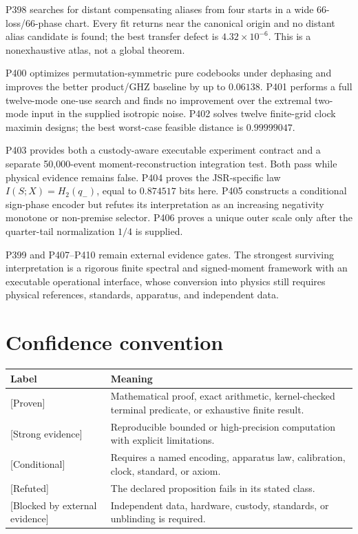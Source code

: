 \documentclass[11pt,a4paper,openany]{report}
\newcommand{\statusProven}{\textcolor{fingreen}{[Proven]}}
\newcommand{\statusStrong}{\textcolor{finblue}{[Strong evidence]}}
\newcommand{\statusConditional}{\textcolor{finviolet}{[Conditional]}}
\newcommand{\statusRefuted}{\textcolor{finred}{[Refuted]}}
\newcommand{\statusBlocked}{\textcolor{finorange}{[Blocked by external evidence]}}
\begin{document}
P398 searches for distant compensating aliases from four starts in a wide
66-loss/66-phase chart. Every fit returns near the canonical origin and no
distant alias candidate is found; the best transfer defect is
$4.32\times10^{-6}$. This is a nonexhaustive atlas, not a global theorem.

P400 optimizes permutation-symmetric pure codebooks under dephasing and
improves the better product/GHZ baseline by up to $0.06138$. P401 performs a
full twelve-mode one-use search and finds no improvement over the extremal
two-mode input in the supplied isotropic noise. P402 solves twelve finite-grid
clock maximin designs; the best worst-case feasible distance is $0.99999047$.

P403 provides both a custody-aware executable experiment contract and a
separate 50,000-event moment-reconstruction integration test. Both pass while
physical evidence remains false. P404 proves the JSR-specific law
$I(S;X)=H_2(q_-)$, equal to $0.874517$ bits here. P405 constructs a
conditional sign-phase encoder but refutes its interpretation as an
increasing negativity monotone or non-premise selector. P406 proves a unique
outer scale only after the quarter-tail normalization $1/4$ is supplied.

P399 and P407--P410 remain external evidence gates. The strongest surviving
interpretation is a rigorous finite spectral and signed-moment framework with
an executable operational interface, whose conversion into physics still
requires physical references, standards, apparatus, and independent data.

\chapter*{Confidence convention}
\begin{center}
\small
\begin{longtable}{@{}p{}p{}@{}}
\toprule
\textbf{Label} & \textbf{Meaning}\\
\midrule
\endhead
\statusProven & Mathematical proof, exact arithmetic, kernel-checked terminal predicate, or exhaustive finite result.\\
\statusStrong & Reproducible bounded or high-precision computation with explicit limitations.\\
\statusConditional & Requires a named encoding, apparatus law, calibration, clock, standard, or axiom.\\
\statusRefuted & The declared proposition fails in its stated class.\\
\statusBlocked & Independent data, hardware, custody, standards, or unblinding is required.\\
\bottomrule
\end{longtable}
\end{center}
\end{document}
